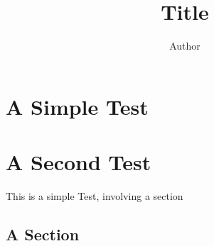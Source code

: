 \documentclass[article,solid]{bmc-test}
\title{Title}
\author{Author}
\begin{document}


\chapter{A Simple Test}
\chapter{A Second Test}

This is a simple Test, involving a section

\section{A Section}
\end{document}
